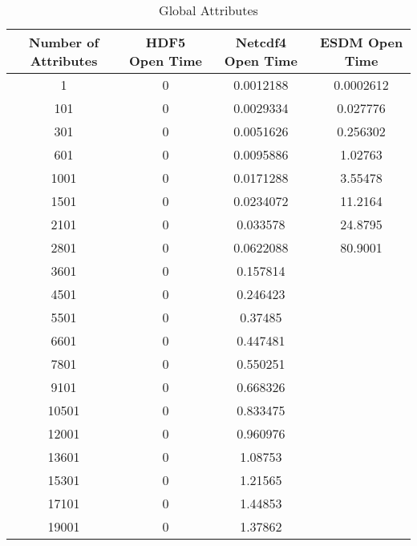\begin{table}[H]
\centering
\begin{tabular}{|c|c|c|c|}
\hline
Number of Attributes  & HDF5 Open Time & Netcdf4 Open Time & ESDM Open Time \\ \hline \hline
1                     &  0                  &   0.0012188                    &      0.0002612           \\ \hline
101                   &   0                 &   0.0029334                    &      0.027776            \\ \hline
301                   &    0                &   0.0051626                    &      0.256302            \\ \hline
601                   &     0               &   0.0095886                    &      1.02763             \\ \hline
1001                  &      0              &   0.0171288                    &      3.55478             \\ \hline
1501                  &       0             &   0.0234072                    &     11.2164              \\ \hline
2101                  &        0            &   0.033578                     &     24.8795              \\ \hline
2801 & 0 & 0.0622088 & 80.9001 \\ \hline
3601 & 0 & 0.157814 & \\ \hline
4501 & 0 & 0.246423 & \\ \hline
5501 & 0 & 0.37485 & \\ \hline
6601 & 0 & 0.447481 & \\ \hline
7801 & 0 & 0.550251 & \\ \hline
9101 & 0 & 0.668326 & \\ \hline
10501 & 0 & 0.833475 & \\ \hline
12001 & 0 & 0.960976 & \\ \hline
13601 & 0 & 1.08753 & \\ \hline
15301 & 0 & 1.21565 & \\ \hline
17101 & 0 & 1.44853 & \\ \hline
19001 & 0 & 1.37862 & \\ \hline
\hline
\end{tabular}
\caption{\label{tab:global_atts} Global Attributes}
\end{table}

